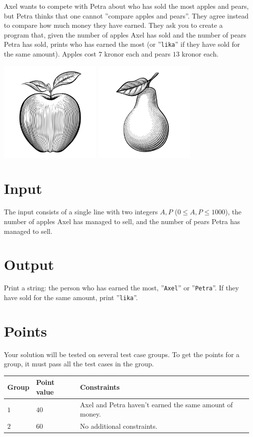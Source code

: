 
Axel wants to compete with Petra about who has sold the most apples and pears, but Petra thinks that one cannot
”compare apples and pears”. 
They agree instead to compare how much money they have earned. They ask you to create a program that,
given the number of apples Axel has sold and the number of pears Petra has sold, prints who has earned
the most (or ”\texttt{lika}” if they have sold for the same amount). Apples cost $7$ kronor each and pears $13$ kronor each.

\begin{center}
  \includegraphics[width=5cm]{apple.jpg}
  \includegraphics[width=5cm]{pear.jpg}
\end{center}


\section*{Input}
The input consists of a single line with two integers $A,P$ ($0 \leq A,P \leq 1000$),
the number of apples Axel has managed to sell, and the number of pears Petra has managed to sell.

\section*{Output}
Print a string: the person who has earned the most, ”\texttt{Axel}” or ”\texttt{Petra}”.
If they have sold for the same amount, print ”\texttt{lika}”.

\section*{Points}
Your solution will be tested on several test case groups.
To get the points for a group, it must pass all the test cases in the group.

\noindent
\begin{tabular}{| l | l | p{12cm} |}
  \hline
  \textbf{Group} & \textbf{Point value} & \textbf{Constraints} \\ \hline
  $1$   & $40$       & Axel and Petra haven't earned the same amount of money. \\ \hline
  $2$   & $60$       & No additional constraints. \\ \hline
\end{tabular}

